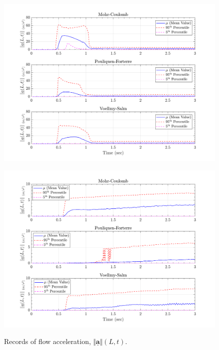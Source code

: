 \documentclass{article}
\begin{document}
\begin{figure}[H]
	\begin{minipage}[b]{0.5\linewidth}
    	\centering
    	\includegraphics[width=1\textwidth]{InclinedPlane/LocalRecords/Records/accel_L15.png}
    	\label{fig:Ramp-L3-Acc}
	\end{minipage}
	\begin{minipage}[b]{0.5\linewidth}
		\centering
		\includegraphics[width=1\textwidth]{InclinedPlane/LocalRecords/Records/accel_L17.png}
    	\label{fig:Ramp-L4-Acc}
    \end{minipage}
    \caption{Records of flow acceleration, $\Vert \underline{\mathbf{a}} \Vert(L,t)$.}
    \label{fig:Ramp-LM-Acc}
\end{figure}
\end{document}
